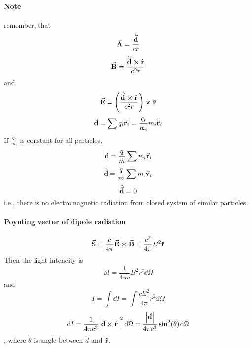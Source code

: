 \paragraph{Note}
remember, that
$$\va{A} = \frac{\dot{\va{d}}}{cr}$$
$$\va{B}= \frac{\ddot{\va{d}}\cross \vu{r}}{c^2r}$$
and
$$\va{E} = \qty(\frac{\ddot{\va{d}}\cross \vu{r}}{c^2r} ) \cross \vu{r}$$
$$\va{d} = \sum q_i \va{r}_i  = \frac{q_i}{m_i} m_i \va{r}_i$$
If $\frac{q_i}{m_i}$ is constant for all particles,
$$\va{d} = \frac{q}{m} \sum m_i \va{r}_i$$
$$\dot{\va{d}}  =\frac{q}{m}\sum m_i \va{v}_i$$
$$\ddot{\va{d}} = 0$$
i.e., there is no electromagnetic radiation from closed system of similar particles.

\paragraph{Poynting vector of dipole radiation}
$$\va{S} = \frac{c}{4\pi} \va{E} \cross \va{B}  = \frac{c^2}{4\pi} B^2 \vu{r}$$
Then the light intencity is
$$\dd{I} = \frac{1}{4\pi c} B^2 r^2 \dd{\Omega}$$
and
$$I  = \int \dd{I} = \int \frac{cE^2}{4\pi}r^2 \dd{\Omega}$$
$$\dd{I} = \frac{1}{4\pi c^3}\abs{\va{d}\cross \vu{r}}^2 \dd{\Omega} = \frac{\abs{\va{d}}}{4\pi c^3} \sin[2](\theta) \dd{\Omega}$$
, where $\theta$ is angle between $\ddot{d}$ and $\vu{r}$.